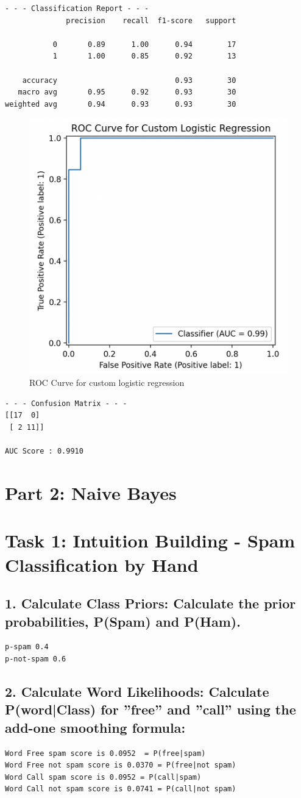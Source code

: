 \documentclass[11pt]{article}
\begin{document}
\begin{verbatim}
- - - Classification Report - - -
              precision    recall  f1-score   support

           0       0.89      1.00      0.94        17
           1       1.00      0.85      0.92        13

    accuracy                           0.93        30
   macro avg       0.95      0.92      0.93        30
weighted avg       0.94      0.93      0.93        30    
\end{verbatim}

\begin{figure}[h]
    \centering
    \includegraphics[width=0.5\linewidth]{4.png}
    \caption{ROC Curve for custom logistic regression}
    \label{fig 4}
\end{figure}

\begin{verbatim}
- - - Confusion Matrix - - -
[[17  0]
 [ 2 11]]

AUC Score : 0.9910
\end{verbatim}
\section{Part 2: Naive Bayes}
\section{Task 1: Intuition Building - Spam Classification by Hand}
\subsection{1. Calculate Class Priors: Calculate the prior probabilities, P(Spam) and P(Ham).}
\begin{verbatim}
p-spam 0.4
p-not-spam 0.6
\end{verbatim}

\subsection{2. Calculate Word Likelihoods: Calculate P(word|Class) for ”free” and ”call” using the add-one smoothing formula:}
\begin{verbatim}
Word Free spam score is 0.0952  = P(free|spam)
Word Free not spam score is 0.0370 = P(free|not spam)
Word Call spam score is 0.0952 = P(call|spam)
Word Call not spam score is 0.0741 = P(call|not spam)
\end{verbatim}
\end{document}
